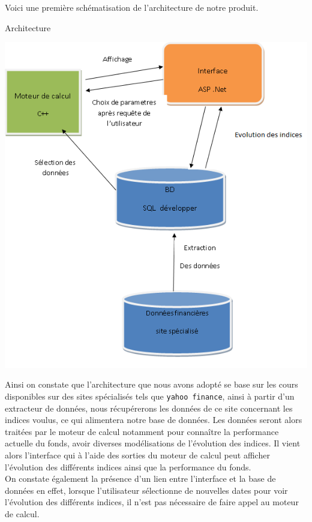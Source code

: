 \documentclass[french,12pt,a4paper]{article}
\begin{document}
Voici une première schématisation de l'architecture de notre produit.

\begin{center}
\caption{Architecture}
\end{center}

\begin{center}
\includegraphics[scale=0.5]{graphe.png}
\end{center}

\noindent Ainsi on constate que l'architecture que nous avons adopté se base sur les cours disponibles sur des sites spécialisés tels que \lstinline!yahoo finance!, ainsi à partir d'un extracteur de données, nous récupérerons les données de ce site concernant les indices voulus, ce qui alimentera notre base de données. Les données seront alors traitées par le moteur de calcul notamment pour connaître la performance actuelle du fonds, avoir diverses modélisations de l'évolution des indices. Il vient alors l'interface qui à l'aide des sorties du moteur de calcul peut afficher l'évolution des différents indices ainsi que la performance du fonds.\\
On constate également la présence d'un lien entre l'interface et la base de données en effet, lorsque l'utilisateur sélectionne de nouvelles dates pour voir l'évolution des différents indices, il n'est pas nécessaire de faire appel au moteur de calcul.
\end{document}
